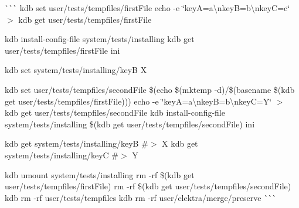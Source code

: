 \`{}\`{}\`{} kdb set user/tests/tempfiles/first\+File  echo -\/e \char`\"{}key\+A=a\textbackslash{}nkey\+B=b\textbackslash{}nkey\+C=c\char`\"{} $>$ {\ttfamily kdb get user/tests/tempfiles/first\+File} 
\begin{DoxyCode}{0}
\end{DoxyCode}
 kdb install-\/config-\/file system/tests/installing {\ttfamily kdb get user/tests/tempfiles/first\+File} ini 
\begin{DoxyCode}{0}
\end{DoxyCode}
 kdb set system/tests/installing/keyB X 
\begin{DoxyCode}{0}
\DoxyCodeLine{}
\end{DoxyCode}
 kdb set user/tests/tempfiles/second\+File \$(echo \$(mktemp -\/d)/\$(basename \$(kdb get user/tests/tempfiles/first\+File))) echo -\/e \char`\"{}key\+A=a\textbackslash{}nkey\+B=b\textbackslash{}nkey\+C=\+Y\char`\"{} $>$ {\ttfamily kdb get user/tests/tempfiles/second\+File} kdb install-\/config-\/file system/tests/installing \$(kdb get user/tests/tempfiles/second\+File) ini 
\begin{DoxyCode}{0}
\end{DoxyCode}
 kdb get system/tests/installing/keyB \#$>$ X kdb get system/tests/installing/keyC \#$>$ Y 
\begin{DoxyCode}{0}
\end{DoxyCode}
 kdb umount system/tests/installing rm -\/rf \$(kdb get user/tests/tempfiles/first\+File) rm -\/rf \$(kdb get user/tests/tempfiles/second\+File) kdb rm -\/rf user/tests/tempfiles kdb rm -\/rf user/elektra/merge/preserve \`{}\`{}\`{} 